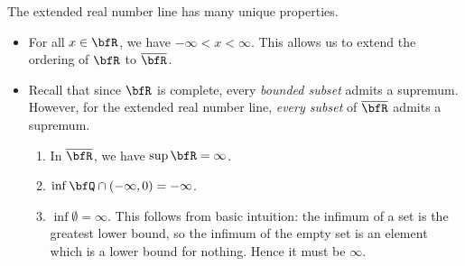     The extended real number line has many unique properties.
    \begin{itemize}
        \item For all $x \in \bfR$, we have $-\infty < x < \infty$. This allows us to extend the ordering of $\bfR$ to $\overline{\bfR}$.
        \item Recall that since $\bfR$ is complete, every \textit{bounded subset} admits a supremum. However, for the extended real number line, \textit{every subset} of $\overline{\bfR}$ admits a supremum.
            \begin{example}
                \phantom{a}
                \begin{enumerate}[label = (\roman*),itemsep=1pt,topsep=3pt]
                    \item In $\overline{\bfR}$, we have $\sup \bfR = \infty$.
                    \item $\inf \bfQ \cap (-\infty,0) = -\infty$.
                    \item $\inf \emptyset = \infty$. This follows from basic intuition: the infimum of a set is the greatest lower bound, so the infimum of the empty set is an element which is a lower bound for nothing. Hence it must be $\infty$.
                \end{enumerate}
            \end{example}


\end{itemize}

